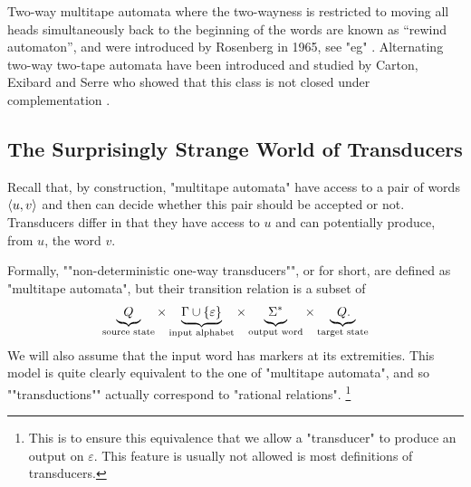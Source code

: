 Two-way multitape automata where the two-wayness is restricted to
moving all heads simultaneously back to the beginning of the words 
are known as ``rewind automaton'', and were introduced by Rosenberg in 1965,
see "eg" \cite[\S~4]{Chan1980ReversalBoundedComputations}.
Alternating two-way two-tape automata have been introduced
and studied by Carton, Exibard and Serre who
showed that this class is not closed under complementation
\cite[Theorem~1]{CartonExibardSerre2017TwoWayTwoTapeAutomata}.

\subsection{The Surprisingly Strange World of Transducers}
\label{sec:prelim-transductions}

Recall that, by construction, "multitape automata" have access to
a pair of words $\langle u,v\rangle$ and then can decide whether 
this pair should be accepted or not. 
Transducers differ in that they have access to $u$ and
can potentially produce, from $u$, the word $v$.

Formally, \AP""non-deterministic one-way transducers"",
or  for short, are defined as "multitape automata", but
their transition relation is a subset of
\[
	\underbrace{\;\;Q\;\;}_{\text{source state\vphantom{l}}}
	\times \underbrace{\Gamma \cup \{\varepsilon\}\vphantom{Q}}_{\text{input alphabet\vphantom{l}}}
	\times \underbrace{\;\Sigma^*\vphantom{Q}\;}_{\text{output word\vphantom{l}}}
	\times \underbrace{\;\;Q.\;\!\;}_{\text{target state\vphantom{l}}}
\]
We will also assume that the input word has markers at its extremities.
This model is quite clearly equivalent to the one of "multitape automata",
and so ""transductions"" actually correspond to "rational relations".%
\footnote{This is to ensure this equivalence that we allow
a "transducer" to produce an output on $\varepsilon$.
This feature is usually not allowed is most definitions of transducers.}

